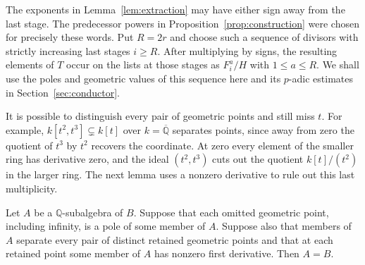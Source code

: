 The exponents in Lemma~\ref{lem:extraction} may have either sign away from the last stage.
The predecessor powers in Proposition~\ref{prop:construction} were chosen for precisely these words.
Put $R = 2r$ and choose such a sequence of divisors with strictly increasing last stages $i \ge R$.
After multiplying by signs, the resulting elements of $T$ occur on the lists at those stages as $F_i^{a}/H$ with $1 \le a \le R$.
We shall use the poles and geometric values of this sequence here and its $p$-adic estimates in Section~\ref{sec:conductor}.

It is possible to distinguish every pair of geometric points and still miss $t$.
For example, $k[t^2, t^3] \subsetneq k[t]$ over $k = \overline{\mathbb{Q}}$ separates points, since away from zero the quotient of $t^3$ by $t^2$ recovers the coordinate.
At zero every element of the smaller ring has derivative zero, and the ideal $(t^2, t^3)$ cuts out the quotient $k[t]/(t^2)$ in the larger ring.
The next lemma uses a nonzero derivative to rule out this last multiplicity.

\begin{lemma}
    \label{lem:curve-recognition}
    Let $A$ be a $\mathbb{Q}$-subalgebra of $B$.
    Suppose that each omitted geometric point, including infinity, is a pole of some member of $A$.
    Suppose also that members of $A$ separate every pair of distinct retained geometric points and that at each retained point some member of $A$ has nonzero first derivative.
    Then $A = B$.
\end{lemma}

